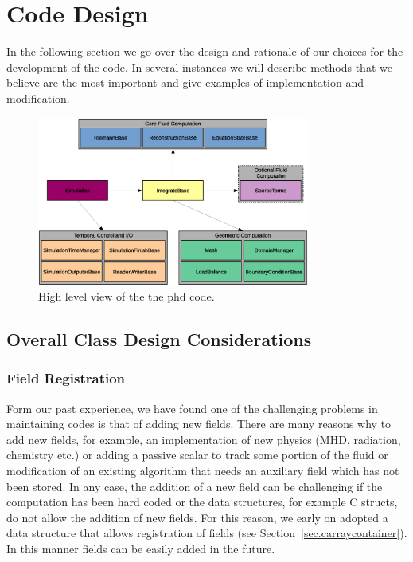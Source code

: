 \section{Code Design}
In the following section we go over the design and rationale of our choices
for the development of the code. In several instances we will describe 
methods that we believe are the most important and give examples of 
implementation and modification.
\begin{figure}
    \begin{center}
        \includegraphics[width=0.8\textwidth]{figures/phd_chart.eps}
        \caption{High level view of the the phd code.}
        \label{fig.phd_design}
    \end{center}
\end{figure}

\subsection{Overall Class Design Considerations}
\subsubsection{Field Registration}
Form our past experience, we have found one of the challenging problems in maintaining codes
is that of adding new fields. There are many reasons why to add new fields, for example,
an implementation of new physics (MHD, radiation, chemistry etc.) or adding a passive scalar
to track some portion of the fluid or modification of an existing algorithm that needs an auxiliary
field which has not been stored. In any case, the addition of a new field can be challenging
if the computation has been hard coded or the data structures, for example C structs, do not
allow the addition of new fields. For this reason, we early on adopted a data structure
that allows registration of fields (see Section~\ref{sec.carraycontainer}). In this manner
fields can be easily added in the future.

